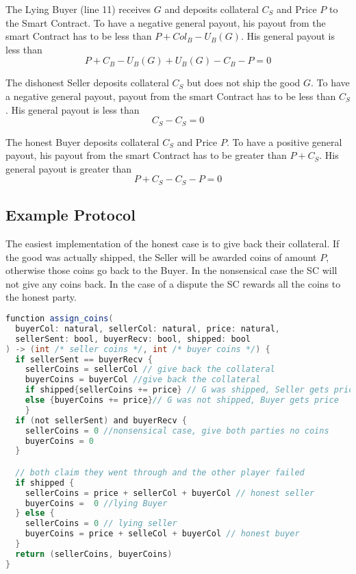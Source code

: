 \documentclass{cacthesis}
\begin{document}
The Lying Buyer (line 11) receives $G$ and deposits collateral $C_S$ and Price $P$ to the Smart Contract. To have a negative general payout, his payout from the smart Contract has to be less than $P + Col_B - U_B(G)$. His general payout is less than
\[P + C_B - U_B(G) + U_B(G) - C_B -P = 0\]

The dishonest Seller deposits collateral $C_S$ but does not ship the good $G$. To have a negative general payout, payout from the smart Contract has to be less than $C_S$. His general payout is less than
\[C_S - C_S = 0\]

The honest Buyer deposits collateral $C_S$ and Price $P$. To have a positive general payout, his payout from the smart Contract has to be greater than $P + C_S$. His general payout is greater than
\[P + C_S - C_S - P = 0\]

\subsection{Example Protocol}
The easiest implementation of the honest case is to give back their collateral. If the good was actually shipped, the Seller will be awarded coins of amount $P$, otherwise those coins go back to the Buyer.\newline
In the nonsensical case the SC will not give any coins back.\newline
In the case of a dispute the SC rewards all the coins to the honest party.

\begin{lstlisting}[language=java]
function assign_coins(
  buyerCol: natural, sellerCol: natural, price: natural,
  sellerSent: bool, buyerRecv: bool, shipped: bool
) -> (int /* seller coins */, int /* buyer coins */) {
  if sellerSent == buyerRecv { 
    sellerCoins = sellerCol // give back the collateral
    buyerCoins = buyerCol //give back the collateral
    if shipped{sellerCoins += price} // G was shipped, Seller gets price
    else {buyerCoins += price}// G was not shipped, Buyer gets price
    }
  if (not sellerSent) and buyerRecv { 
    sellerCoins = 0 //nonsensical case, give both parties no coins
    buyerCoins = 0
  }

  // both claim they went through and the other player failed
  if shipped {
    sellerCoins = price + sellerCol + buyerCol // honest seller
    buyerCoins =  0 //lying Buyer
  } else {
    sellerCoins = 0 // lying seller
    buyerCoins = price + selleCol + buyerCol // honest buyer
  }
  return (sellerCoins, buyerCoins)
}
\end{lstlisting}
\end{document}
